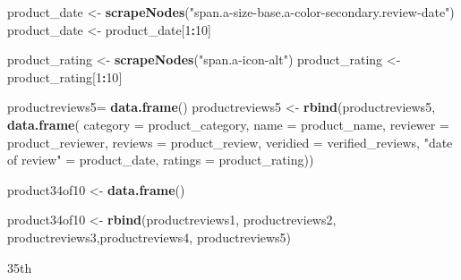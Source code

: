 \documentclass[
]{article}
\newenvironment{Shaded}{\begin{snugshade}}{\end{snugshade}}
\newcommand{\AttributeTok}[1]{\textcolor[rgb]{0.13,0.29,0.53}{#1}}
\newcommand{\DecValTok}[1]{\textcolor[rgb]{0.00,0.00,0.81}{#1}}
\newcommand{\FunctionTok}[1]{\textcolor[rgb]{0.13,0.29,0.53}{\textbf{#1}}}
\newcommand{\NormalTok}[1]{#1}
\newcommand{\OtherTok}[1]{\textcolor[rgb]{0.56,0.35,0.01}{#1}}
\newcommand{\SpecialCharTok}[1]{\textcolor[rgb]{0.81,0.36,0.00}{\textbf{#1}}}
\newcommand{\StringTok}[1]{\textcolor[rgb]{0.31,0.60,0.02}{#1}}
\begin{document}
\begin{Shaded}
\begin{Highlighting}[]
\NormalTok{  product\_date }\OtherTok{\textless{}{-}} \FunctionTok{scrapeNodes}\NormalTok{(}\StringTok{"span.a{-}size{-}base.a{-}color{-}secondary.review{-}date"}\NormalTok{)}
\NormalTok{  product\_date }\OtherTok{\textless{}{-}}\NormalTok{ product\_date[}\DecValTok{1}\SpecialCharTok{:}\DecValTok{10}\NormalTok{]}
  
\NormalTok{  product\_rating }\OtherTok{\textless{}{-}} \FunctionTok{scrapeNodes}\NormalTok{(}\StringTok{"span.a{-}icon{-}alt"}\NormalTok{)}
\NormalTok{  product\_rating }\OtherTok{\textless{}{-}}\NormalTok{ product\_rating[}\DecValTok{1}\SpecialCharTok{:}\DecValTok{10}\NormalTok{]}
  
\NormalTok{  productreviews5}\OtherTok{=} \FunctionTok{data.frame}\NormalTok{()}
\NormalTok{  productreviews5 }\OtherTok{\textless{}{-}} \FunctionTok{rbind}\NormalTok{(productreviews5, }\FunctionTok{data.frame}\NormalTok{(}
                      \AttributeTok{category =}\NormalTok{ product\_category,}
                      \AttributeTok{name =}\NormalTok{ product\_name,}
                      \AttributeTok{reviewer =}\NormalTok{ product\_reviewer,}
                      \AttributeTok{reviews =}\NormalTok{ product\_review,}
                      \AttributeTok{veridied =}\NormalTok{ verified\_reviews,}
                      \StringTok{"date of review"} \OtherTok{=}\NormalTok{ product\_date,}
                      \AttributeTok{ratings =}\NormalTok{ product\_rating))}
  
\NormalTok{  product34of10 }\OtherTok{\textless{}{-}} \FunctionTok{data.frame}\NormalTok{()}
  
\NormalTok{  product34of10 }\OtherTok{\textless{}{-}} \FunctionTok{rbind}\NormalTok{(productreviews1, productreviews2, productreviews3,productreviews4, productreviews5)}
\end{Highlighting}
\end{Shaded}

35th
\end{document}
